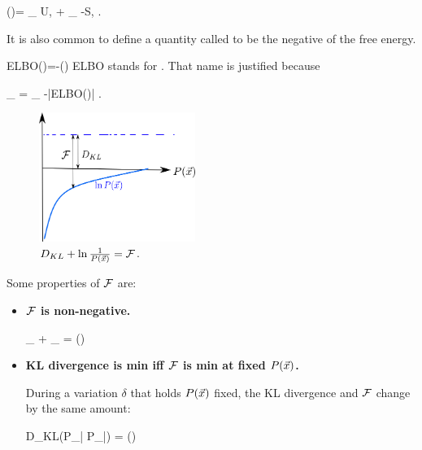 \beq 
\calf(\vecx)=
_
{U, }
+
_
{-S, }
\;.
\eeq

It is also common to define a
quantity called  to be the negative
of the free energy.

\beq
ELBO(\vecx)=-\calf(\vecx)
\eeq
ELBO stands for .
That name
is justified because

\beq
{}
_{ }
=
_{}
-|ELBO(\vecx)|
\;.
\eeq

\begin{figure}[h!]
\centering
\includegraphics[width=2in]
{var-bay/elbo.png}
\caption{
$D_{KL}+\ln \frac{1}{P({\vec{x}})}={\cal F}$.
}
\label{fig-elbo}
\end{figure}

Some properties of ${\cal F}$ are:
\begin{itemize}

\item{\bf  ${\cal F}$ is non-negative.}

\beq
{}_{}
+ \underbrace{\ln\frac{1}
{ P_{\vec{\rvx}}(\vecx)]}}_{}
= \calf(\vecx)
\eeq



\item {\bf KL divergence is  min  iff ${\cal F}$ is min
at fixed $P({\vec{x}})$.}

During a variation $\delta$ that holds
$P({\vec{x}})$ fixed, 
the KL divergence and ${\cal F}$ change
by the same amount:

\beq
\delta D_{KL}(P_{\rvq|\vec{\rvx}}\parallel
P_{\rvh|\vec{\rvx}})
=
\delta \calf(\vecx)
\eeq

\end{itemize}




